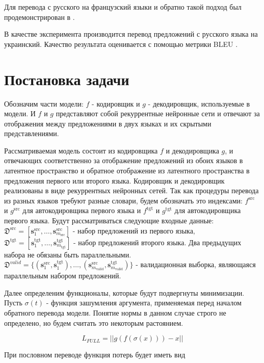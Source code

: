 \documentclass[12pt,twoside]{article}
\begin{document}
Для перевода с русского на французский языки и обратно такой подход был продемонстрирован в \cite{lample2017unsupervised}.

В качестве эксперимента производится перевод предложений с русского языка на украинский. Качество результата оценивается с помощью метрики BLEU \cite{papineni2002bleu}.

\section{Постановка задачи}

Обозначим части модели: $f$ - кодировщик и $g$ - декодировщик, используемые в модели. И $f$ и $g$ представляют собой рекуррентные нейронные сети и отвечают за отображения между предложениями в двух языках и их скрытыми представлениями. 

Рассматриваемая модель состоит из кодировщика $f$ и декодировщика $g$, и отвечающих соответственно за отображение предложений из обоих языков в латентное пространство и обратное отображение из латентного пространства в предложения первого или второго языка. Кодировщик и декодировщик реализованы в виде рекуррентных нейронных сетей. Так как процедуры перевода из разных языков требуют разные словари, будем обозначать это индексами: $f^{\text{src}}$ и $g^{\text{src}}$ для автокодировщика первого языка и $f^{\text{tgt}}$ и $g^{\text{tgt}}$ для автокодировщика первого языка. Будут рассматриваться следующие входные данные: $\mathfrak{D}^{\text{src}} = [\mathbf{s}_1^{\text{src}}, \dots, \mathbf{s}_{m_\text{src}}^{\text{src}}]$ - набор предложений из первого языка, $\mathfrak{D}^{\text{tgt}} = [\mathbf{s}_1^{\text{tgt}}, \dots, \mathbf{s}_{m_\text{tgt}}^{\text{tgt}}]$ - набор предложений второго языка. Два предыдущих набора не обязаны быть параллельными. $\mathfrak{D}^{valid} = \{(\mathbf{s}_1^{\text{src}}, \mathbf{s}_1^{\text{tgt}}), \dots, (\mathbf{s}_{m_\text{valid}}^{\text{src}}, \mathbf{s}_{m_\text{valid}}^{\text{tgt}})\}$ - валидационная выборка, являющаяся параллельным набором предложений.

Далее определеним функционалы, которые будут подвергнуты минимизации. Пусть $\sigma(t)$ - функция зашумления аргумента, применяемая перед началом обратного перевода модели. Понятие нормы в данном случае строго не определено, но будем считать это некоторым растоянием.

$$L_{FULL} = ||g(f(\sigma(x)))-x||$$

При пословном переводе функция потерь будет иметь вид
\end{document}
